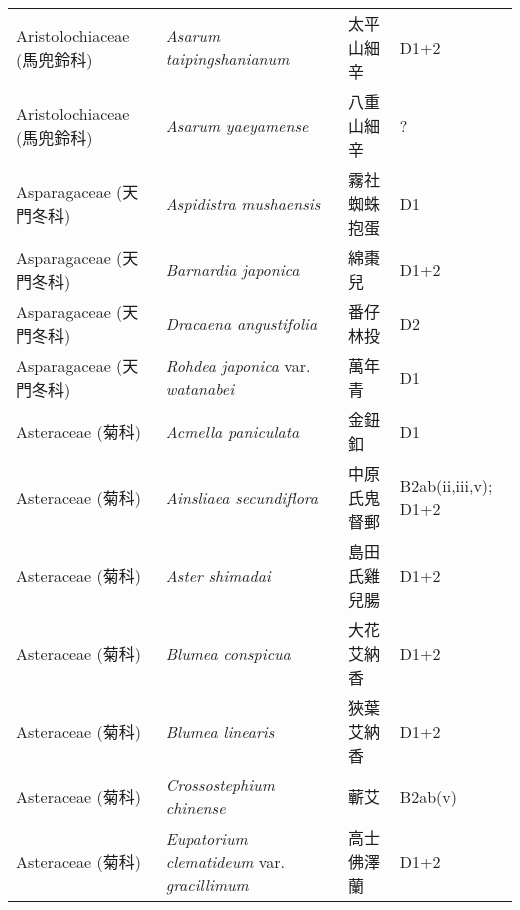 \begin{longtable}{p{3cm}p{5cm}p{3cm}p{4cm}}
    Aristolochiaceae (馬兜鈴科) & \textit{Asarum taipingshanianum}  & 太平山細辛 & D1+2 \index{Asarum@\textit{Asarum}!taipingshanianum@\textit{taipingshanianum}}  \index{太平山細辛} \\
    Aristolochiaceae (馬兜鈴科) & \textit{Asarum yaeyamense}  & 八重山細辛 & ? \index{Asarum@\textit{Asarum}!yaeyamense@\textit{yaeyamense}}  \index{八重山細辛} \\
    Asparagaceae (天門冬科) & \textit{Aspidistra mushaensis}  & 霧社蜘蛛抱蛋 & D1 \index{Aspidistra@\textit{Aspidistra}!mushaensis@\textit{mushaensis}}  \index{霧社蜘蛛抱蛋} \\
    Asparagaceae (天門冬科) & \textit{Barnardia japonica}  & 綿棗兒 & D1+2 \index{Barnardia@\textit{Barnardia}!japonica@\textit{japonica}}  \index{綿棗兒} \\
    Asparagaceae (天門冬科) & \textit{Dracaena angustifolia}  & 番仔林投 & D2 \index{Dracaena@\textit{Dracaena}!angustifolia@\textit{angustifolia}}  \index{番仔林投} \\
    Asparagaceae (天門冬科) & \textit{Rohdea japonica} var. \textit{watanabei}  & 萬年青 & D1 \index{Rohdea@\textit{Rohdea}!japonica@\textit{japonica}!var. watanabei@var. \textit{watanabei}}  \index{萬年青} \\
    Asteraceae (菊科) & \textit{Acmella paniculata}  & 金鈕釦 & D1 \index{Acmella@\textit{Acmella}!paniculata@\textit{paniculata}}  \index{金鈕釦} \\
    Asteraceae (菊科) & \textit{Ainsliaea secundiflora}  & 中原氏鬼督郵 & B2ab(ii,iii,v); D1+2 \index{Ainsliaea@\textit{Ainsliaea}!secundiflora@\textit{secundiflora}}  \index{中原氏鬼督郵} \\
    Asteraceae (菊科) & \textit{Aster shimadai}  & 島田氏雞兒腸 & D1+2 \index{Aster@\textit{Aster}!shimadai@\textit{shimadai}}  \index{島田氏雞兒腸} \\
    Asteraceae (菊科) & \textit{Blumea conspicua}  & 大花艾納香 & D1+2 \index{Blumea@\textit{Blumea}!conspicua@\textit{conspicua}}  \index{大花艾納香} \\
    Asteraceae (菊科) & \textit{Blumea linearis}  & 狹葉艾納香 & D1+2 \index{Blumea@\textit{Blumea}!linearis@\textit{linearis}}  \index{狹葉艾納香} \\
    Asteraceae (菊科) & \textit{Crossostephium chinense}  & 蘄艾 & B2ab(v) \index{Crossostephium@\textit{Crossostephium}!chinense@\textit{chinense}}  \index{蘄艾} \\
    Asteraceae (菊科) & \textit{Eupatorium clematideum} var. \textit{gracillimum}  & 高士佛澤蘭 & D1+2 \index{Eupatorium@\textit{Eupatorium}!clematideum@\textit{clematideum}!var. gracillimum@var. \textit{gracillimum}}  \index{高士佛澤蘭} \\

\end{longtable}
